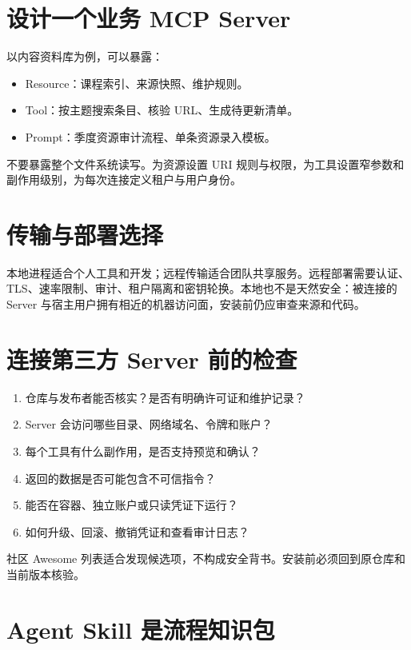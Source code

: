 \section{设计一个业务 MCP Server}

以内容资料库为例，可以暴露：

\begin{itemize}
  \item Resource：课程索引、来源快照、维护规则。
  \item Tool：按主题搜索条目、核验 URL、生成待更新清单。
  \item Prompt：季度资源审计流程、单条资源录入模板。
\end{itemize}

不要暴露整个文件系统读写。为资源设置 URI 规则与权限，为工具设置窄参数和副作用级别，为每次连接定义租户与用户身份。

\section{传输与部署选择}

本地进程适合个人工具和开发；远程传输适合团队共享服务。远程部署需要认证、TLS、速率限制、审计、租户隔离和密钥轮换。本地也不是天然安全：被连接的 Server 与宿主用户拥有相近的机器访问面，安装前仍应审查来源和代码。

\section{连接第三方 Server 前的检查}

\begin{enumerate}
  \item 仓库与发布者能否核实？是否有明确许可证和维护记录？
  \item Server 会访问哪些目录、网络域名、令牌和账户？
  \item 每个工具有什么副作用，是否支持预览和确认？
  \item 返回的数据是否可能包含不可信指令？
  \item 能否在容器、独立账户或只读凭证下运行？
  \item 如何升级、回滚、撤销凭证和查看审计日志？
\end{enumerate}

社区 Awesome 列表适合发现候选项，不构成安全背书。安装前必须回到原仓库和当前版本核验。

\section{Agent Skill 是流程知识包}

